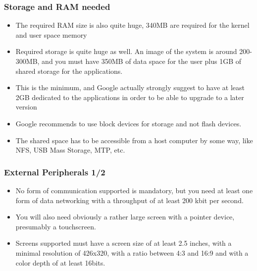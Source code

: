 \begin{frame}
  \frametitle{Storage and RAM needed}
  \begin{itemize}
  \item The required RAM size is also quite huge, 340MB are required
    for the kernel and user space memory
  \item Required storage is quite huge as well. An image of the system
    is around 200-300MB, and you must have 350MB of data space for the
    user plus 1GB of shared storage for the applications.
  \item This is the minimum, and Google actually strongly suggest to
    have at least 2GB dedicated to the applications in order to be
    able to upgrade to a later version
  \item Google recommends to use block devices for storage and not
    flash devices.
  \item The shared space has to be accessible from a host computer by
    some way, like NFS, USB Mass Storage, MTP, etc.
  \end{itemize}
\end{frame}

\begin{frame}
  \frametitle{External Peripherals 1/2}
  \begin{itemize}
  \item No form of communication supported is mandatory, but you need
    at least one form of data networking with a throughput of at least
    200 kbit per second.
  \item You will also need obviously a rather large screen with a
    pointer device, presumably a touchscreen.
  \item Screens supported must have a screen size of at least 2.5
    inches, with a minimal resolution of 426x320, with a ratio between
    4:3 and 16:9 and with a color depth of at least 16bits.
  \end{itemize}
\end{frame}

